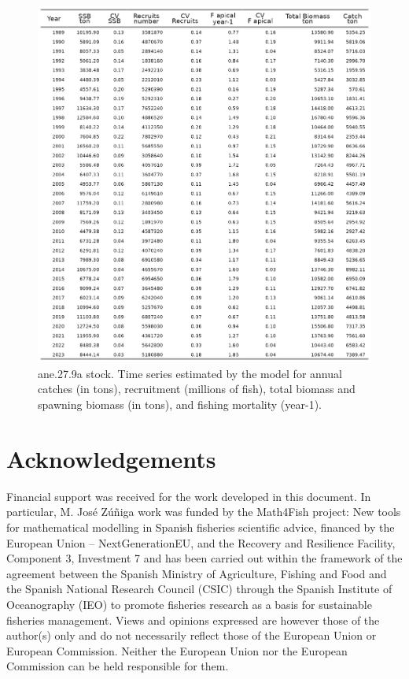 \documentclass[
]{article}
\begin{document}
\begin{figure}[H]

{\centering \includegraphics[width=0.95\linewidth]{report/run/S1.0_4FLEETS/tb_timeseries} 

}

\caption{ane.27.9a stock. Time series estimated by the model for annual catches (in tons), recruitment (millions of fish), total biomass and spawning biomass (in tons), and fishing mortality (year-1).}\label{fig:unnamed-chunk-39}
\end{figure}

\hypertarget{acknowledgements}{%
\section{Acknowledgements}\label{acknowledgements}}

Financial support was received for the work developed in this document.
In particular, M. José Zúñiga work was funded by the Math4Fish project:
New tools for mathematical modelling in Spanish fisheries scientific
advice, financed by the European Union -- NextGenerationEU, and the
Recovery and Resilience Facility, Component 3, Investment 7 and has been
carried out within the framework of the agreement between the Spanish
Ministry of Agriculture, Fishing and Food and the Spanish National
Research Council (CSIC) through the Spanish Institute of Oceanography
(IEO) to promote fisheries research as a basis for sustainable fisheries
management. Views and opinions expressed are however those of the
author(s) only and do not necessarily reflect those of the European
Union or European Commission. Neither the European Union nor the
European Commission can be held responsible for them.
\end{document}
